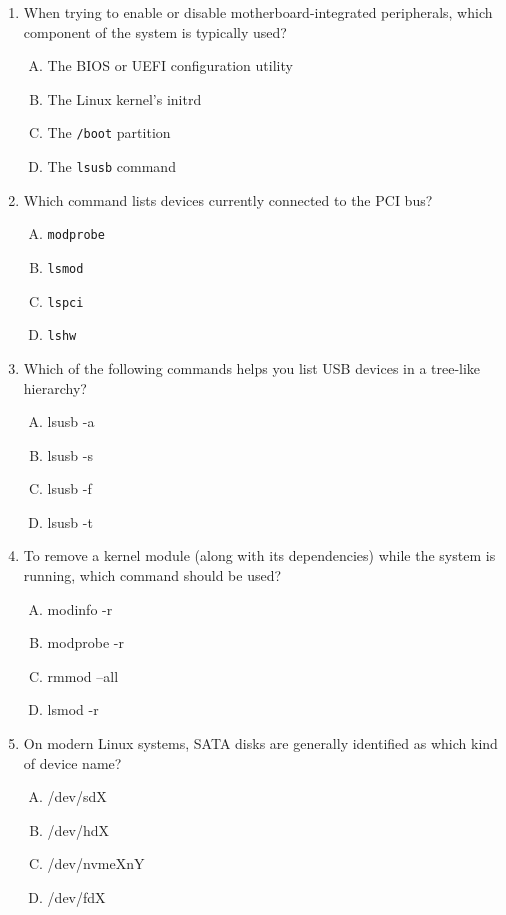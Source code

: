 \documentclass[a4paper]{report}
\begin{document}
\begin{enumerate}[1.]
\item When trying to enable or disable motherboard-integrated peripherals, which component of the system is typically used?
  \begin{enumerate}[A)]
    \item The BIOS or UEFI configuration utility
    \item The Linux kernel’s initrd
    \item The \texttt{/boot} partition
    \item The \texttt{lsusb} command

  \end{enumerate}

\item Which command lists devices currently connected to the PCI bus?
  \begin{enumerate}[A)]
    \item \texttt{modprobe}
    \item \texttt{lsmod}
    \item \texttt{lspci}
    \item \texttt{lshw}
  \end{enumerate}

\item Which of the following commands helps you list USB devices in a tree-like hierarchy?
  \begin{enumerate}[A)]
    \item lsusb -a
    \item lsusb -s
    \item lsusb -f
    \item lsusb -t
  \end{enumerate}

\item To remove a kernel module (along with its dependencies) while the system is running, which command should be used?
  \begin{enumerate}[A)]
    \item modinfo -r
    \item modprobe -r
    \item rmmod --all
    \item lsmod -r
  \end{enumerate}

\item On modern Linux systems, SATA disks are generally identified as which kind of device name?
  \begin{enumerate}[A)]
    \item /dev/sdX
    \item /dev/hdX
    \item /dev/nvmeXnY
    \item /dev/fdX
  \end{enumerate}


\end{enumerate}
\end{document}
